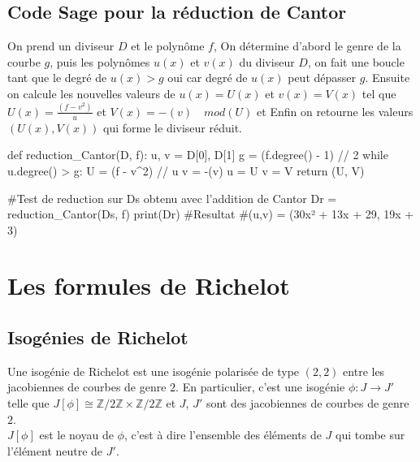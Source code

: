 \documentclass[12pt,a4paper]{article}
\begin{document}
	\subsection*{Code Sage pour la réduction de Cantor}
	On prend un diviseur $D$ et le polynôme $f$, On détermine d'abord le genre de la courbe $g$, puis les polynômes $u(x)$ et $v(x)$ du diviseur $D$, on fait une boucle tant que le degré de $u(x) > g$ oui car degré de $u(x)$ peut dépasser $g$. Ensuite on calcule les nouvelles valeurs de $u(x) = U(x)$ et $v(x) = V(x)$ tel que $U(x) = \frac{(f-v^2)}{u}$ et $V(x) = -(v)\quad mod(U)$ et Enfin on retourne les valeurs $(U(x),V(x))$ qui forme le diviseur réduit.   
	\begin{sageblock}
		
		def reduction_Cantor(D, f):
				u, v = D[0], D[1]
				g = (f.degree() - 1) // 2
				while u.degree() > g:
						U = (f - v^2) // u
						v = -(v) %
						u = U
						v = V
				return (U, V)
		
		#Test de reduction sur Ds obtenu avec l'addition de Cantor
		Dr = reduction_Cantor(Ds, f)
		print(Dr)
		#Resultat 
		#(u,v) = (30x² + 13x + 29, 19x + 3)
	\end{sageblock}
	\vspace{1cm}
	\newpage
	\section{Les formules de Richelot}
	\subsection{Isogénies de Richelot}
	Une isogénie de Richelot est une isogénie polarisée de type $(2,2)$ entre les jacobiennes de courbes de genre $2$. En particulier, c'est une isogénie $\phi : J \to J'$ telle que $J[\phi] \cong \mathbb{Z}/2\mathbb{Z} \times \mathbb{Z}/2\mathbb{Z}$ et $J$, $J'$ sont des jacobiennes de courbes de genre $2$. \\
	$J[\phi]$ est le noyau de $\phi$, c'est \`a dire l'ensemble des éléments de $J$ qui tombe sur l'élément neutre de $J'$.
	
\end{document}
